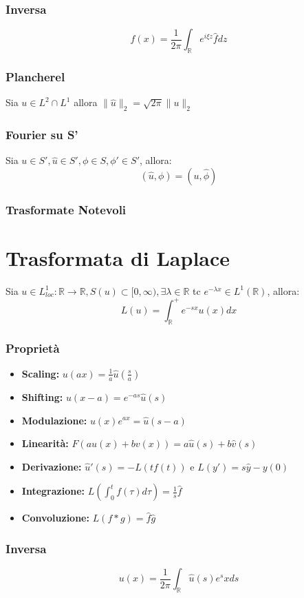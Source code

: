 \documentclass[a4paper,notitlepage]{report}%
\newcommand{\R}{\mathbb{R}}%
\begin{document}
\begin{multicols*}{2}
\subsubsection*{Inversa}
\[
    f(x)=\frac{1}{2\pi}\int_\R e^{i\xi z}\hat{f} dz
\]
\subsubsection{Plancherel}
Sia $u\in L^2\cap L^1$ allora $\|\hat{u}\|_2=\sqrt{2\pi}\|u\|_2$
\subsubsection{Fourier su S'}
Sia $u\in S', \hat{u}\in S', \phi \in S,\phi' \in S'$, allora:
\[
    (\hat{u},\phi)=(u,\hat{\phi})    
\]
\subsubsection*{Trasformate Notevoli}


\section*{Trasformata di Laplace}
Sia $u\in L^1_{loc}:\R\to\R, S(u)\subset [0,\infty),\exists\lambda\in\R$ tc $e^{-\lambda x}\in L^1(\R)$, allora:
\[
    L(u)=\int_\R^+ e^{-sx}u(x)dx
\]
\subsubsection*{Proprietà}
\begin{itemize}
    \item \textbf{Scaling:} $u(ax) = \frac{1}{a}\hat{u}(\frac{s}{a})$
    \item \textbf{Shifting:} $u(x-a) = e^{-as}\hat{u}(s)$
    \item \textbf{Modulazione:} $u(x)e^{ax} = \hat{u}(s-a)$
    \item \textbf{Linearità:} $F(au(x)+bv(x)) = a\hat{u}(s)+b\hat{v}(s)$
    \item \textbf{Derivazione:} $\hat{u}'(s) = -L(tf(t))$ e $L(y')=s\hat{y}-y(0)$
    \item \textbf{Integrazione:} $L(\int_0^t f(\tau)d\tau) = \frac{1}{s}\hat{f}$
    \item \textbf{Convoluzione: } $L(f*g)=\hat{f}\hat{g}$
\end{itemize}
\subsubsection*{Inversa}
\[
    u(x)=\frac{1}{2\pi}\int_\R \hat{u}(s)e^sx ds
\]

\end{multicols*}
\end{document}

